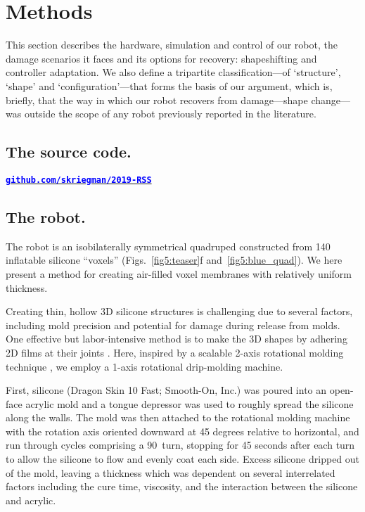 
\section{Methods}
\label{sec5:methods}

This section describes the hardware, simulation and control of our robot,
the damage scenarios it faces and its options for recovery: 
shapeshifting and controller adaptation.
We also define a tripartite classification---of `structure', `shape' and `configuration'---that forms the basis of our argument, which is, briefly, that the way in which our robot recovers from damage---shape change---was outside the scope of any robot previously reported in the literature.


\subsection*{The source code.}
\href{https://github.com/skriegman/2019-RSS}{\textcolor{blue}{\textbf{\texttt{github.com/skriegman/2019-RSS}}}}



\subsection*{The robot.}
\label{sec5:robot}





The robot is an isobilaterally symmetrical quadruped constructed from 140 inflatable silicone ``voxels'' 
(Figs.~\ref{fig5:teaser}f and~\ref{fig5:blue_quad}).
We here present a method for creating air-filled voxel membranes with relatively uniform thickness.


Creating thin, hollow 3D silicone structures is challenging due to several factors, including mold precision and potential for damage during release from molds. One effective but labor-intensive method is to make the 3D shapes by adhering 2D films at their joints \cite{morin_elastomeric_2014}. Here, inspired by a scalable 2-axis rotational molding technique \cite{zhao_scalable_2015}, we employ a \mbox{1-axis} rotational drip-molding machine.

First, silicone (Dragon Skin 10 Fast; Smooth-On, Inc.) was poured into an open-face acrylic mold and a tongue depressor was used to roughly spread the silicone along the walls. The mold was then attached to the rotational molding machine with the rotation axis oriented downward at 45 degrees relative to horizontal, and run through cycles comprising a 90\textdegree~turn, stopping for 45 seconds after each turn to allow the silicone to flow and evenly coat each side. Excess silicone dripped out of the mold, leaving a thickness which was dependent on several interrelated factors including the cure time, viscosity, and the interaction between the silicone and acrylic.

